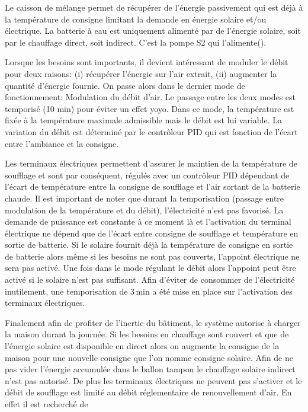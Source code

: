 Le caisson de mélange permet de récupérer de l’énergie passivement qui est déjà à
la température de consigne limitant la demande en énergie solaire et/ou électrique.
La batterie à eau est uniquement alimenté par de l’énergie solaire, soit par le chauffage
direct, soit indirect. C’est la pompe S2 qui l’alimente().

Lorsque les besoins sont importants, il devient intéressant de moduler le débit pour deux
raisons: (i) récupérer l’énergie sur l’air extrait, (ii) augmenter la quantité d’énergie fournie.
On passe alors dans le dernier mode de fonctionnement: Modulation du débit d’air.
Le passage entre les deux modes est temporisé (10 min) pour éviter un effet yoyo.
Dans ce mode, la température est fixée
à la température maximale admissible mais le débit est lui variable. La variation du débit
est déterminé par le contrôleur PID qui est fonction de l’écart entre l’ambiance et la consigne.

Les terminaux électriques permettent d’assurer le maintien de la température de soufflage et sont par
conséquent, régulés avec un contrôleur PID dépendant de l’écart de température entre
la consigne de soufflage et l’air sortant de la batterie chaude.
Il est important de noter que durant la temporisation (passage entre modulation de la température et du débit),
l’électricité n’est pas favorisé. La demande de puissance est constante à ce moment là
et l’activation du terminal électrique ne dépend que de l’écart entre consigne de soufflage
et température en sortie de batterie. Si le solaire fournit déjà la température
de consigne en sortie de batterie alors même si les besoins ne sont pas couverts,
l’appoint électrique ne sera pas activé. Une fois dans le mode régulant le débit alors
l’appoint peut être activé si le solaire n’est pas suffisant.
Afin d’éviter de consommer de l’électricité inutilement, une temporisation de 3\,\si{min}
a été mise en place sur l’activation des terminaux électriques.

Finalement afin de profiter de l’inertie du bâtiment, le système autorise à charger
la maison durant la journée. Si les besoins en chauffage sont couvert et que de l’énergie solaire
est disponible en direct alors on augmente la consigne de la maison pour une nouvelle
consigne que l’on nomme consigne solaire.
Afin de ne pas vider l’énergie accumulée dans le ballon tampon le chauffage solaire
indirect n’est pas autorisé. De plus les terminaux électriques ne peuvent pas s’activer
et le débit de soufflage est limité au débit réglementaire de renouvellement d’air.
En effet il est recherché de


